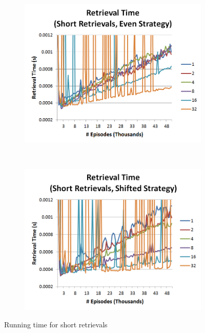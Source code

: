 \documentclass[11pt]{article} %
\begin{document}
\begin{figure}
        \centering
        \begin{subfigure}[b]{0.55\textwidth}
                \centering
                \includegraphics[width=\textwidth]{images/ret_short_eq}
                \label{fig:retseq}
        \end{subfigure}%
        ~ %
        \begin{subfigure}[b]{0.55\textwidth}
                \centering
                \includegraphics[width=\textwidth]{images/ret_short_shift}
                \label{fig:retsshift}
        \end{subfigure}
        \caption{Running time for short retrievals}\label{fig:short}
	
\end{figure}
\end{document}
